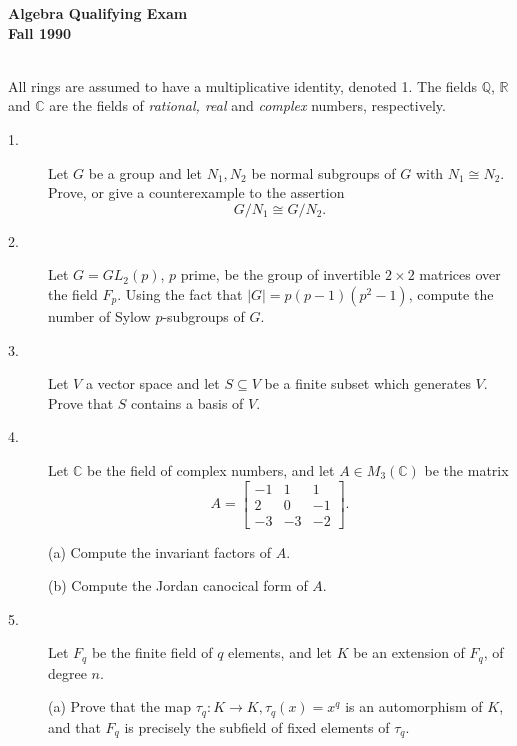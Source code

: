 \documentclass{article}
\def\R{\mathbb R}
\def\C{\mathbb C}
\def\Q{\mathbb Q}
\begin{document}

   
\begin{center}\begin{LARGE}
{\bf Algebra Qualifying Exam}\\ 
{\bf Fall 1990}\\ \end{LARGE}
\end{center}
\vspace{0.1in}
\noindent\hrulefill\\

All rings are assumed to have a multiplicative identity, denoted 1. The
fields $\Q$, $\R$ and $\C$ are the fields of {\it rational, real} and
{\it complex} numbers, respectively.

\begin{description}
\item[1.]
Let $G$ be a group and let $N_1, N_2$ be normal subgroups of $G$ with
$N_1 \cong N_2$. Prove, or give a counterexample to the assertion
$$G/N_1 \cong G/N_2.$$

\item[2.]
Let $G=GL_2(p)$, $p$ prime, be the group of invertible $2 \times 2$
matrices over the field $F_p$. Using the fact that $|G| = p(p-1)(p^2-1)$,
compute the number of Sylow $p$-subgroups of $G$.

\item[3.]
Let $V$ a vector space and let $S \subseteq V$ be a finite subset which
generates $V$. Prove that $S$ contains a basis of $V$.

\item[4.]
Let $\C$ be the field of complex numbers, and let $A \in M_3(\C)$ be the matrix
$$A= \begin{bmatrix} -1&1&1 \\ 2&0&-1 \\ -3&-3&-2 \end{bmatrix}.$$

\item[\quad] (a)
Compute the invariant factors of $A$.

\item[\quad] (b)
Compute the Jordan canocical form of $A$.

\item[5.]
Let $F_q$ be the finite field of $q$ elements, and let $K$ be an extension
of $F_q$, of degree $n$.

\item[\quad] (a)
Prove that the map $\tau_q: K \to K, \tau_q (x) = x^q$ is an automorphism of
$K$, and that $F_q$ is precisely the subfield of fixed elements of $\tau_q$.


\end{description}
\end{document}

